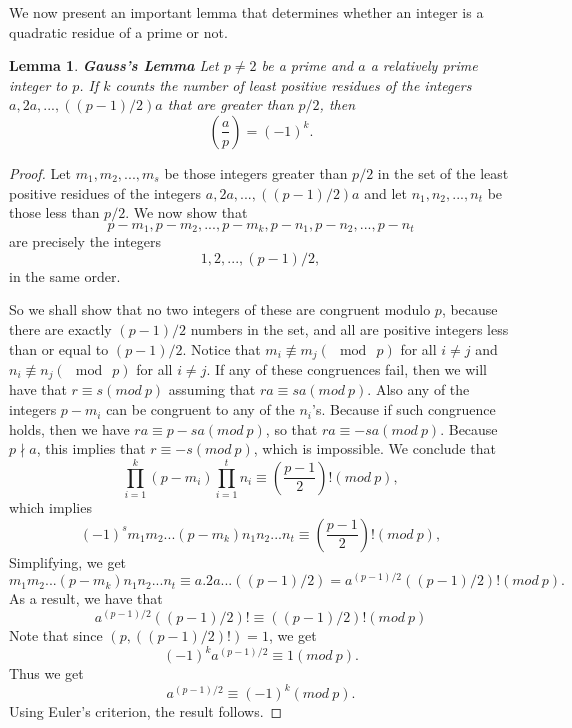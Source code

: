 \documentclass[12pt,letterpaper]{book}
\newtheorem{lemma}{Lemma}
\begin{document}
We now present an important lemma that determines whether an integer
is a quadratic residue of a prime or not. 
\begin{lemma}\textbf{Gauss's Lemma} Let $p\neq 2$ be a prime and
$a$ a relatively prime integer to $p$.  If $k$ counts the number of
least positive residues of the integers $a, 2a,...,((p-1)/2)a$ that
are greater than $p/2$, then
\begin{equation*}
\left(\frac{a}{p}\right)=(-1)^k.
\end{equation*}
\end{lemma}

\begin{proof}
Let $m_1,m_2,...,m_s$ be those integers greater than $p/2$ in the
set of the least positive residues of the integers $a,
2a,...,((p-1)/2)a$ and let $n_1,n_2,...,n_t$ be those less than
$p/2$. We now show that
\begin{equation*}
p-m_1,p-m_2,...,p-m_k,p-n_1,p-n_2,...,p-n_t
\end{equation*}
are precisely the integers
\begin{equation*}
1,2,...,(p-1)/2,
\end{equation*}
in the same order.
\par So we shall show that no two integers of these are
congruent modulo $p$, because there are exactly $(p-1)/2$ numbers in
the set, and all are positive integers less than or equal to
$(p-1)/2$. Notice that $m_i\not\equiv m_j (\mod \ p)$ for all $i\neq
j$ and $n_i\not\equiv n_j (\mod \ p)$ for all $i\neq j$.  If any of
these congruences fail, then we will have that $r\equiv s(mod \ p)$
assuming that $ra\equiv sa(mod \ p)$. Also any of the integers
$p-m_i$ can be congruent to any of the $n_i$'s. Because if such
congruence holds, then we have $ra\equiv p-sa(mod \ p)$, so that
$ra\equiv -sa(mod \ p)$.  Because $p\nmid a$, this implies that
$r\equiv -s(mod \ p)$, which is impossible. We conclude that
\begin{equation*}
\prod_{i=1}^k(p-m_i)\prod_{i=1}^tn_i\equiv
\left(\frac{p-1}{2}\right)!(mod \ p),
\end{equation*}
which implies
\begin{equation*}
(-1)^sm_1m_2...(p-m_k)n_1n_2...n_t\equiv
\left(\frac{p-1}{2}\right)!(mod \ p),
\end{equation*}
Simplifying, we get
\begin{equation*}
m_1m_2...(p-m_k)n_1n_2...n_t\equiv a.2a...((p-1)/2)=
a^{(p-1)/2}((p-1)/2)!( mod \ p).
\end{equation*}
As a result, we have that
\begin{equation*}
a^{(p-1)/2}((p-1)/2)!\equiv ((p-1)/2)!(mod \ p)
\end{equation*}
Note that since $(p,((p-1)/2)!)=1$, we get
\begin{equation*}
(-1)^ka^{(p-1)/2}\equiv 1(mod \ p).
\end{equation*}
Thus we get
\begin{equation*}
a^{(p-1)/2}\equiv(-1)^k(mod \ p).
\end{equation*}
Using Euler's criterion, the result follows.
\end{proof}
\end{document}
